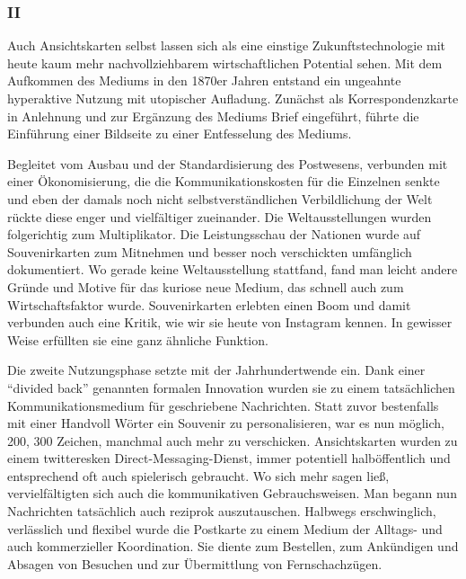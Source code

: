 \documentclass[a4paper,
fontsize=11pt,
oneside,
numbers=noperiodatend,
parskip=half-,
bibliography=totoc,
final
]{scrartcl}
\begin{document}
\hypertarget{ii}{%
\subsubsection{II}\label{ii}}

Auch Ansichtskarten selbst lassen sich als eine einstige
Zukunftstechnologie mit heute kaum mehr nachvollziehbarem
wirtschaftlichen Potential sehen. Mit dem Aufkommen des Mediums in den
1870er Jahren entstand ein ungeahnte hyperaktive Nutzung mit utopischer
Aufladung. Zunächst als Korrespondenzkarte in Anlehnung und zur
Ergänzung des Mediums Brief eingeführt, führte die Einführung einer
Bildseite zu einer Entfesselung des Mediums.

Begleitet vom Ausbau und der Standardisierung des Postwesens, verbunden
mit einer Ökonomisierung, die die Kommunikationskosten für die Einzelnen
senkte und eben der damals noch nicht selbstverständlichen
Verbildlichung der Welt rückte diese enger und vielfältiger zueinander.
Die Weltausstellungen wurden folgerichtig zum Multiplikator. Die
Leistungsschau der Nationen wurde auf Souvenirkarten zum Mitnehmen und
besser noch verschickten umfänglich dokumentiert. Wo gerade keine
Weltausstellung stattfand, fand man leicht andere Gründe und Motive für
das kuriose neue Medium, das schnell auch zum Wirtschaftsfaktor wurde.
Souvenirkarten erlebten einen Boom und damit verbunden auch eine Kritik,
wie wir sie heute von Instagram kennen. In gewisser Weise erfüllten sie
eine ganz ähnliche Funktion.

Die zweite Nutzungsphase setzte mit der Jahrhundertwende ein. Dank einer
\enquote{divided back} genannten formalen Innovation wurden sie zu einem
tatsächlichen Kommunikationsmedium für geschriebene Nachrichten. Statt
zuvor bestenfalls mit einer Handvoll Wörter ein Souvenir zu
personalisieren, war es nun möglich, 200, 300 Zeichen, manchmal auch
mehr zu verschicken. Ansichtskarten wurden zu einem twitteresken
Direct-Messaging-Dienst, immer potentiell halböffentlich und
entsprechend oft auch spielerisch gebraucht. Wo sich mehr sagen ließ,
vervielfältigten sich auch die kommunikativen Gebrauchsweisen. Man
begann nun Nachrichten tatsächlich auch reziprok auszutauschen. Halbwegs
erschwinglich, verlässlich und flexibel wurde die Postkarte zu einem
Medium der Alltags- und auch kommerzieller Koordination. Sie diente zum
Bestellen, zum Ankündigen und Absagen von Besuchen und zur Übermittlung
von Fernschachzügen.
\end{document}
